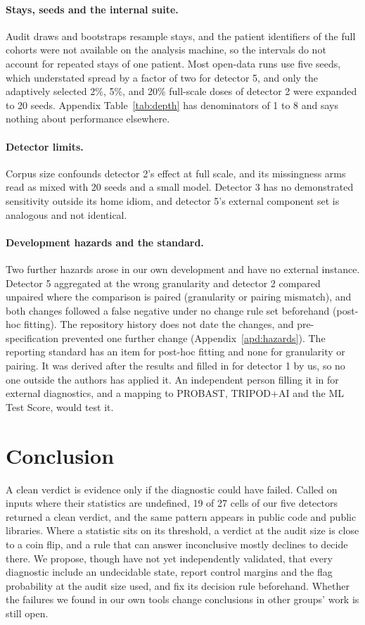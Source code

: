 \documentclass[10pt]{article}
\theoremstyle{definition}
\begin{document}
\paragraph{Stays, seeds and the internal suite.} Audit draws and bootstraps resample stays, and the patient identifiers of the full cohorts were not available on the analysis machine, so the intervals do not account for repeated stays of one patient. Most open-data runs use five seeds, which understated spread by a factor of two for detector 5, and only the adaptively selected 2\%, 5\%, and 20\% full-scale doses of detector 2 were expanded to 20 seeds. Appendix Table~\ref{tab:depth} has denominators of 1 to 8 and says nothing about performance elsewhere.

\paragraph{Detector limits.} Corpus size confounds detector 2's effect at full scale, and its missingness arms read as mixed with 20 seeds and a small model. Detector 3 has no demonstrated sensitivity outside its home idiom, and detector 5's external component set is analogous and not identical.

\paragraph{Development hazards and the standard.} Two further hazards arose in our own development and have no external instance. Detector 5 aggregated at the wrong granularity and detector 2 compared unpaired where the comparison is paired (granularity or pairing mismatch), and both changes followed a false negative under no change rule set beforehand (post-hoc fitting). The repository history does not date the changes, and pre-specification prevented one further change (Appendix~\ref{apd:hazards}). The reporting standard has an item for post-hoc fitting and none for granularity or pairing. It was derived after the results and filled in for detector 1 by us, so no one outside the authors has applied it. An independent person filling it in for external diagnostics, and a mapping to PROBAST, TRIPOD+AI and the ML Test Score, would test it.

\section{Conclusion}
\label{sec:conclusion}

A clean verdict is evidence only if the diagnostic could have failed. Called on inputs where their statistics are undefined, 19 of 27 cells of our five detectors returned a clean verdict, and the same pattern appears in public code and public libraries. Where a statistic sits on its threshold, a verdict at the audit size is close to a coin flip, and a rule that can answer inconclusive mostly declines to decide there. We propose, though have not yet independently validated, that every diagnostic include an undecidable state, report control margins and the flag probability at the audit size used, and fix its decision rule beforehand. Whether the failures we found in our own tools change conclusions in other groups' work is still open.
\end{document}
